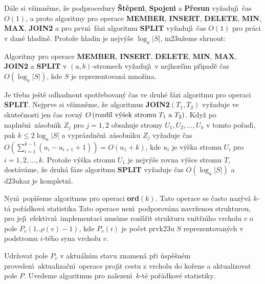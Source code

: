 \flushpar D\'ale si v\v simn\v eme, \v ze podprocedury {\bf \v St\v epen\'\i }, {\bf Spojen\'\i} a {\bf P\v re\-sun }
vy\v zaduj\'\i\ \v cas $O\left(1\right)$, a proto algoritmy pro operace {\bf MEMBER}, 
{\bf INSERT}, {\bf DELETE}, {\bf MIN}, {\bf MAX}, {\bf JOIN2} a pro prvn\'\i\ f\'azi algoritmu 
{\bf SPLIT} vy\v zaduj\'\i\ \v cas $O\left(1\right)$ pro pr\'aci v dan\'e hladin\v e.  Proto\v ze 
hladin je nejv\'y\v se $\log_a|S|$, m\accent23u\v zeme shrnout: 


Algoritmy pro operace {\bf MEMBER}, {\bf INSERT}, 
{\bf DE\-LETE}, {\bf MIN}, {\bf MAX}, {\bf JOIN2} a {\bf SPLIT} v $
\left(a,b\right)$-stromech vy\-\v zaduj\'\i\ 
v nejhor\v s\'\i m p\v r\'\i pad\v e \v cas $O\left(\log_a|S|\right)$, kde $
S$ je 
re\-pre\-zen\-tovan\'a mno\v zina.  
\endproclaim


\flushpar Je t\v reba je\v st\v e odhadnout spot\v rebovan\'y \v cas ve druh\'e f\'azi 
algoritmu pro operaci {\bf SPLIT}. Nejprve si v\v simn\v eme, \v ze 
algoritmus {\bf JOIN2$\left(T_1,T_2\right)$} vy\v zaduje ve skute\v cnosti jen \v cas 
rovn\'y 
$O\left(\text{\rm rozd\'\i l v\'y\v sek strom\accent23u }T_1\text{\rm \ a }
T_2\right)$. Kdy\v z po napln\v en\'\i\ 
z\'asobn\'\i k $Z_j$ pro $j=1,2$ obsahuje stromy $U_1,U_2,\dots,U_
k$ v tomto 
po\v rad\'\i , pak $k\le 2\log_a|S|$ a vypr\'azdn\v en\'\i\ z\'asobn\'\i ku $
Z_j$ 
vy\v zaduje 
\v cas $O\left(\sum_{i=1}^{k-1}\left(u_i-u_{i+1}+1\right)\right)=O\left(u_1+k\right)$, kde $u_i$ je v\'y\v ska stromu $
U_i$ pro 
$i=1,2,\dots,k$. Proto\v ze v\'y\v ska stromu $U_1$ je nejv\'y\v se rovna v\'y\v sce 
stromu $T$, dost\'av\'ame, \v ze druh\'a f\'aze algoritmu {\bf SPLIT} vy\v zaduje 
\v cas $O\left(\log_a|S|\right)$ a d\accent23ukaz je kompletn\'\i . 
\medskip

\flushpar Nyn\'\i\ pop\'\i\v seme algoritmus pro operaci {\bf ord$
\left(k\right)$}. Tato 
operace se \v casto naz\'yv\'a $k$-t\'a po\v r\'adko\-v\'a statistika
Tato operace nen\'\i\ podporov\'ana navr\v zenou 
strukturou, pro jej\'\i\ efektivn\'\i\ implementaci mus\'\i me 
roz\v s\'\i\v rit strukturu vnit\v rn\'\i ho vrcholu $v$ o pole\newline 
$P_v\left(1..\rho \left(v\right)-1\right)$, kde $P_v\left(i\right)$ je po\v cet prvk\accent23u $S$ reprezentovan\'ych 
v podstromu $i$-t\'eho syna vrcholu $v$.
\smallskip
 
\flushpar Udr\v zovat pole $P_v$ v aktu\'aln\'\i m stavu znamen\'a p\v ri \'usp\v e\v sn\'em 
pro\-veden\'\i\ aktualiza\v cn\'\i\ operace proj\'\i t cestu z vrcholu do ko\v re\-ne 
a aktualizovat pole $P$. Uvedeme algoritmus pro 
naleze\-n\'\i\ $k$-t\'e po\v r\'adkov\'e statistiky.
\medskip

